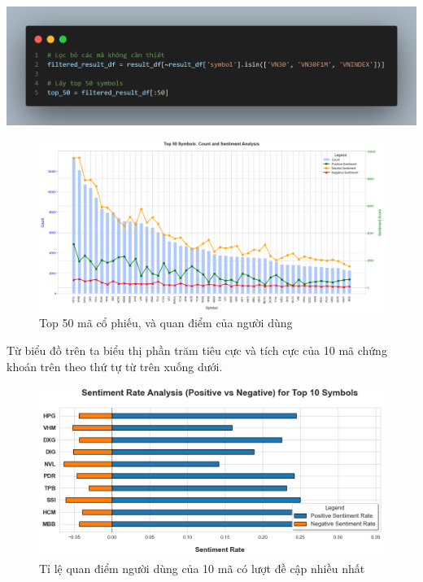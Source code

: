 \begin{center}
\includegraphics[width=0.8\linewidth]{images/code-2.19.png}
\end{center}
\vspace{-0.5em}
\begin{figure}[H]
    \centering
    \includegraphics[width=1\linewidth]{images/plot-2.13-line_column_chart_combined.png}
    \vspace{-2em}
    \caption{Top 50 mã cổ phiếu, và quan điểm của người dùng}
    \label{fig:2.11}
\end{figure}

Từ biểu đồ trên ta biểu thị phần trăm tiêu cực và tích cực của 10 mã chứng khoán trên theo thứ tự từ trên xuống dưới.
\vspace{-0.5em}
\begin{figure}[H]
    \centering
    \includegraphics[width=0.95\linewidth]{images/plot-2.25-plot-bar_chart.png}
    \vspace{-1em}
    \caption{Tỉ lệ quan điểm người dùng của 10 mã có lượt đề cập nhiều nhất }
    \label{fig:2.12}
\end{figure}

